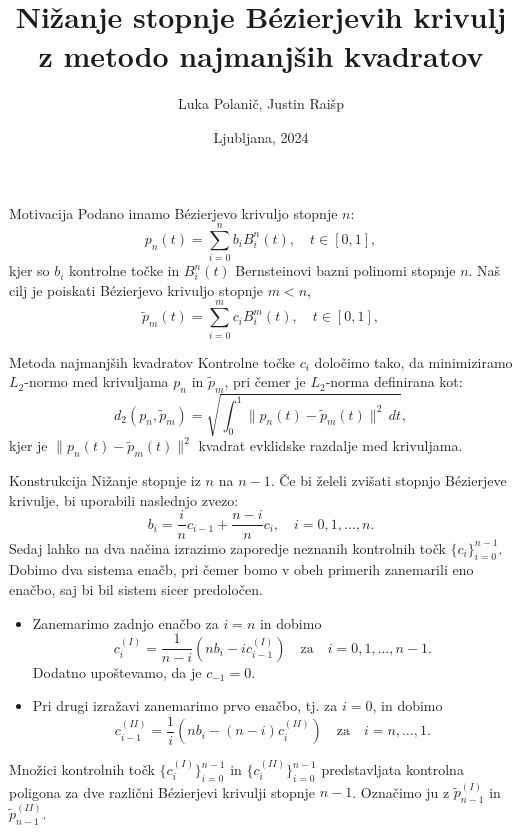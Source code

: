 \documentclass{beamer}
\title[Nižanje stopnje Bézierjevih krivulj]{Nižanje stopnje Bézierjevih krivulj z metodo najmanjših kvadratov}
\author{Luka Polanič, Justin Raišp}
\date{Ljubljana, 2024}
\begin{document}
\begin{frame}
    \titlepage
\end{frame}

\begin{frame}{Motivacija}
    Podano imamo Bézierjevo krivuljo stopnje $n$:
    \[ p_n(t) = \sum_{i=0}^n b_i B_i^n(t), \quad t \in [0, 1], \]
    kjer so $b_i$ kontrolne točke in $B_i^n(t)$ Bernsteinovi bazni polinomi stopnje $n$.
    Naš cilj je poiskati Bézierjevo krivuljo stopnje $m < n$,
    \[ \tilde{p}_m(t) = \sum_{i=0}^m c_i B_i^m(t), \quad t \in [0, 1], \]
\end{frame}

\begin{frame}{Metoda najmanjših kvadratov}
  Kontrolne točke $c_i$ določimo tako, da minimiziramo $L_2$-normo med krivuljama $p_n$ in $\tilde{p}_m$, pri čemer je $L_2$-norma definirana kot:
  \[ d_2(p_n, \tilde{p}_m) = \sqrt{\int_0^1 \|p_n(t) - \tilde{p}_m(t)\|^2 \, dt}, \]
  kjer je $\|p_n(t) - \tilde{p}_m(t)\|^2$ kvadrat evklidske razdalje med krivuljama.
\end{frame}

\begin{frame}{Konstrukcija}
Nižanje stopnje iz $n$ na $n-1$. Če bi želeli zvišati stopnjo Bézierjeve krivulje, bi uporabili naslednjo zvezo: 
\[
b_i = \frac{i}{n} c_{i-1} + \frac{n-i}{n} c_i, \quad i = 0, 1, \ldots, n.
\]
Sedaj lahko na dva načina izrazimo zaporedje neznanih kontrolnih točk $\{c_i\}_{i=0}^{n-1}$.
Dobimo dva sistema enačb, pri čemer bomo v obeh primerih zanemarili eno enačbo,
saj bi bil sistem sicer predoločen.
\end{frame}

\begin{frame}
  \begin{itemize}
    \item Zanemarimo zadnjo enačbo za $i = n$ in dobimo
    \[
    c_i^{(I)} = \frac{1}{n - i} \left( n b_i - i c_{i-1}^{(I)} \right) \quad \text{za} \quad i = 0, 1, \ldots, n - 1.
    \]
    Dodatno upoštevamo, da je $c_{-1} = 0$.
    \item Pri drugi izražavi zanemarimo prvo enačbo, tj. za $i = 0$, in dobimo
    \[
    c_{i-1}^{(II)} = \frac{1}{i} \left( n b_i - (n - i) c_i^{(II)} \right) \quad \text{za} \quad i = n, \ldots, 1.
    \]
  \end{itemize}
  Množici kontrolnih točk $\{c_i^{(I)}\}_{i=0}^{n-1}$ in $\{c_i^{(II)}\}_{i=0}^{n-1}$ predstavljata kontrolna poligona za dve različni Bézierjevi krivulji stopnje $n - 1$. Označimo ju z $\tilde{p}_{n-1}^{(I)}$ in $\tilde{p}_{n-1}^{(II)}$.
\end{frame}
\end{document}
